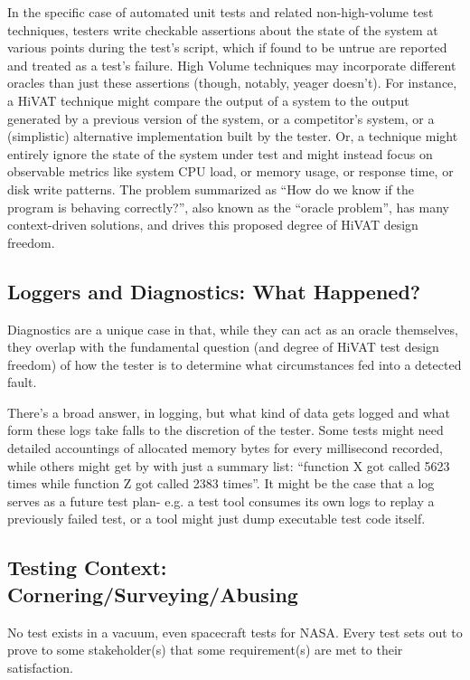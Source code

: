 In the specific case of automated unit tests and related non-high-volume test techniques, testers write checkable assertions about the state of the system at various points during the test's script, which if found to be untrue are reported and treated as a test's failure. High Volume techniques may incorporate different oracles than just these assertions (though, notably, yeager doesn't). For instance, a HiVAT technique might compare the output of a system to the output generated by a previous version of the system, or a competitor's system, or a (simplistic) alternative implementation built by the tester. Or, a technique might entirely ignore the state of the system under test and might instead focus on observable metrics like system CPU load, or memory usage, or response time, or disk write patterns. The problem summarized as ``How do we know if the program is behaving correctly?'', also known as the ``oracle problem'', has many context-driven solutions, and drives this proposed degree of HiVAT design freedom.

\subsection{Loggers and Diagnostics: What Happened?}
Diagnostics are a unique case in that, while they can act as an oracle themselves, they overlap with the fundamental question (and degree of HiVAT test design freedom) of how the tester is to determine what circumstances fed into a detected fault.

There's a broad answer, in logging, but what kind of data gets logged and what form these logs take falls to the discretion of the tester. Some tests might need detailed accountings of allocated memory bytes for every millisecond recorded, while others might get by with just a summary list: ``function X got called 5623 times while function Z got called 2383 times''. It might be the case that a log serves as a future test plan- e.g. a test tool consumes its own logs to replay a previously failed test, or a tool might just dump executable test code itself.

\subsection{Testing Context: Cornering/Surveying/Abusing}
No test exists in a vacuum, even spacecraft tests for NASA. Every test sets out to prove to some stakeholder(s) that some requirement(s) are met to their satisfaction.

